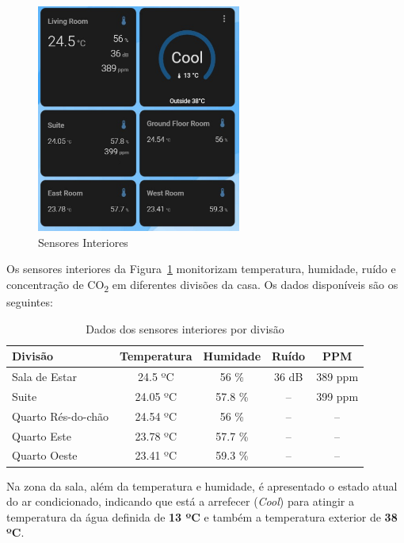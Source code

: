 \begin{figure}[H]
    \centering
    \includegraphics[width=0.6\textwidth]{images/sensores_interiores.png}
    \caption{Sensores Interiores}
    \label{fig:sensores_interiores.png}
\end{figure}

Os sensores interiores da Figura~\ref{fig:sensores_interiores.png} monitorizam temperatura, humidade, ruído e concentração de CO\textsubscript{2} em diferentes divisões da casa. Os dados disponíveis são os seguintes:

\begin{table}[H]
\centering
\begin{tabular}{|l|c|c|c|c|}
\hline
\textbf{Divisão} & \textbf{Temperatura} & \textbf{Humidade} & \textbf{Ruído} & \textbf{PPM} \\
\hline
Sala de Estar & 24.5 ºC & 56 \% & 36 dB & 389 ppm \\
Suite & 24.05 ºC & 57.8 \% & -- & 399 ppm \\
Quarto Rés-do-chão & 24.54 ºC & 56 \% & -- & -- \\
Quarto Este & 23.78 ºC & 57.7 \% & -- & -- \\
Quarto Oeste & 23.41 ºC & 59.3 \% & -- & -- \\
\hline
\end{tabular}
\caption{Dados dos sensores interiores por divisão}
\label{tab:sensores_interiores}
\end{table}

Na zona da sala, além da temperatura e humidade, é apresentado o estado atual do ar condicionado, indicando que está a arrefecer (\textit{Cool}) para atingir a temperatura da água definida de \textbf{13 ºC} e também a temperatura exterior de \textbf{38 ºC}.

